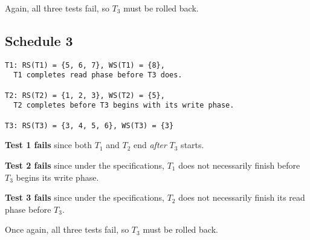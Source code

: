 Again, all three tests fail, so $T_3$ must be rolled back.

\subsection{Schedule 3}

\begin{verbatim}
T1: RS(T1) = {5, 6, 7}, WS(T1) = {8},
  T1 completes read phase before T3 does.

T2: RS(T2) = {1, 2, 3}, WS(T2) = {5},
  T2 completes before T3 begins with its write phase.

T3: RS(T3) = {3, 4, 5, 6}, WS(T3) = {3}
\end{verbatim}

\textbf{Test 1 fails} since both $T_1$ and $T_2$ end \textit{after} $T_3$ starts.
\medskip

\textbf{Test 2 fails} since under the specifications, $T_1$ does not necessarily finish
before $T_3$ begins its write phase. \medskip

\textbf{Test 3 fails} since under the specifications, $T_2$ does not necessarily finish
its read phase before $T_3$. \medskip

Once again, all three tests fail, so $T_3$ must be rolled back.

\tykstreg

